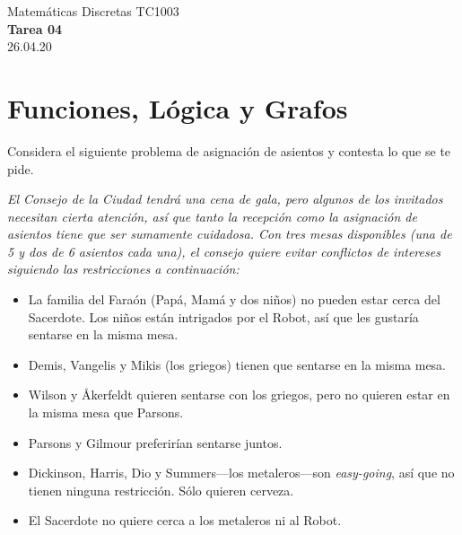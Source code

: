 \documentclass[]{book}
\theoremstyle{definition}
\begin{document}
\begin{center}
{\huge Matemáticas Discretas TC1003}\\[1.5ex]
{\large \textbf{Tarea 04}\\[1.5ex] %
26.04.20} %
\end{center}

\vspace{0.2 cm}

\section*{Funciones, Lógica y Grafos}


\bigskip

{\large Considera el siguiente problema de asignación de asientos y contesta lo que se te pide.}

\bigskip

\begin{tcolorbox}
\slshape El Consejo de la Ciudad tendrá una cena de gala, pero algunos de los invitados necesitan cierta atención, así que tanto la recepción como la asignación de asientos tiene que ser sumamente cuidadosa.
Con tres mesas disponibles (una de 5 y dos de 6 asientos cada una), el consejo quiere evitar conflictos de intereses siguiendo las restricciones a continuación:

\begin{itemize}
	\item La familia del Faraón (Papá, Mamá y dos niños) no pueden estar cerca del Sacerdote. Los niños están intrigados por el Robot, así que les gustaría sentarse en la misma mesa.
	\item Demis, Vangelis y Mikis (los griegos) tienen que sentarse en la misma mesa.
	\item Wilson y \AA kerfeldt quieren sentarse con los griegos, pero no quieren estar en la misma mesa que Parsons.
	\item Parsons y Gilmour preferirían sentarse juntos.
	\item Dickinson, Harris, Dio y Summers---los metaleros---son \textit{easy-going}, así que no tienen ninguna restricción. Sólo quieren cerveza.
	\item El Sacerdote no quiere cerca a los metaleros ni al Robot.
\end{itemize}
\end{tcolorbox}
\end{document}
